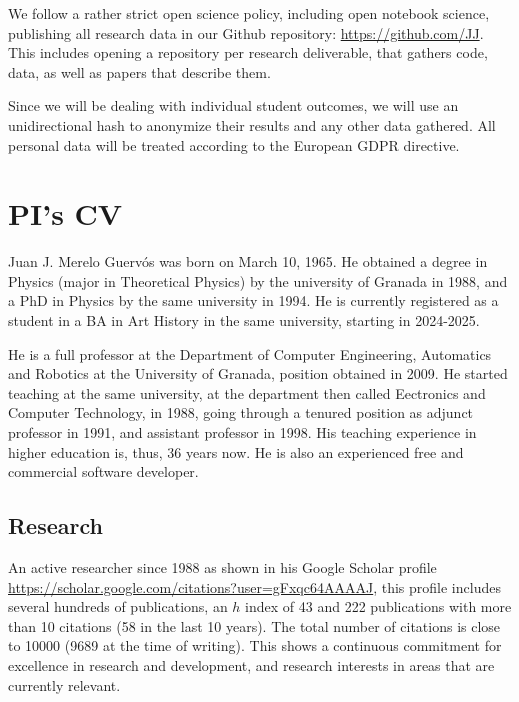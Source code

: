 \documentclass[a4paper,12pt]{article}
\begin{document}
We follow a rather strict open science policy, including open notebook science,
publishing all research data in our Github repository:
\url{https://github.com/JJ}. This includes opening a repository per research
  deliverable, that gathers code, data, as well as papers that describe them.

Since we will be dealing with individual student outcomes, we will use an
unidirectional hash to anonymize their results and any other data gathered. All
personal data will be treated according to the European GDPR directive.

\newpage

\section{PI's CV}

Juan J. Merelo Guervós was born on March 10, 1965. He obtained a degree in Physics (major in Theoretical Physics) by the university of Granada in 1988, and a PhD in Physics by the same university in 1994. He is currently registered as a student in a BA in Art History in the same university, starting in 2024-2025.

He is a full professor at the Department of Computer Engineering, Automatics and
Robotics at the University of Granada, position obtained in 2009. He started
teaching at the same university, at the department then called Eectronics and
Computer Technology, in 1988, going through a tenured position as adjunct
professor in 1991, and assistant professor in 1998. His teaching experience in
higher education is, thus, 36 years now. He is also an experienced
free and commercial software developer.


\subsection{Research}

An active researcher since 1988 as shown in his Google Scholar profile \url{https://scholar.google.com/citations?user=gFxqc64AAAAJ}, this profile includes several hundreds of publications, an $h$ index of 43 and 222 publications with more than 10 citations (58 in the last 10 years). The total number of citations is close to 10000 (9689 at the time of writing). This shows a continuous commitment for excellence in research and development, and research interests in areas that are currently relevant.
\end{document}
